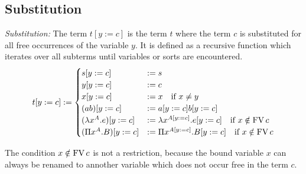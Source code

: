 \subsection{Substitution}


\begin{definition}
    \emph{Substitution:}
    The term $t[y:=c]$ is the term $t$ where the term $c$ is substituted for all
    free occurrences of the variable $y$. It is defined as a recursive function
    which iterates over all subterms until variables or sorts are encountered.
    $$
    t[y:=c] :=
        \begin{cases}
            s[y:=c] &:= s

            \\

            y[y:=c] &:= c

            \\

            x[y:=c] &:= x \quad \text{if } x \ne y

            \\

            (a b)[y:=c] &:= a[y:=c] b[y:=c]

            \\

            (\lambda x^A . e)[y:=c]
            &:=
            \lambda x^{A[y:=c]}. e[y:=c]
                \quad \text{if } x \notin \FV c

            \\

            (\Pi x^A . B)[y:=c]
            &:=
            \Pi x^{A[y:=c]}. B[y:=c]
                \quad \text{if } x \notin \FV c
        \end{cases}
    $$
\end{definition}
The condition $x \notin \FV c$ is not a restriction, because the bound variable
$x$ can always be renamed to annother variable which does not occur free in the
term $c$.



